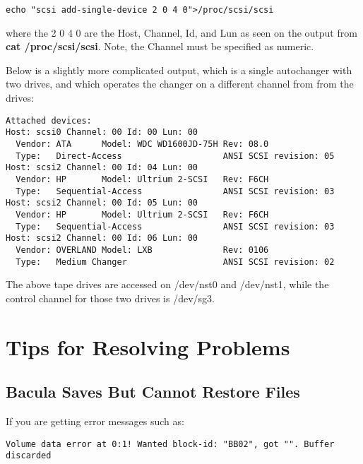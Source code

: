 \footnotesize
\begin{verbatim}
echo "scsi add-single-device 2 0 4 0">/proc/scsi/scsi
\end{verbatim}
\normalsize

where the 2 0 4 0 are the Host, Channel, Id, and Lun as seen on the output
from {\bf cat /proc/scsi/scsi}. Note, the Channel must be specified as
numeric.

Below is a slightly more complicated output, which is a single autochanger
with two drives, and which operates the changer on a different channel
from from the drives:

\footnotesize
\begin{verbatim}
Attached devices:
Host: scsi0 Channel: 00 Id: 00 Lun: 00
  Vendor: ATA      Model: WDC WD1600JD-75H Rev: 08.0
  Type:   Direct-Access                    ANSI SCSI revision: 05
Host: scsi2 Channel: 00 Id: 04 Lun: 00
  Vendor: HP       Model: Ultrium 2-SCSI   Rev: F6CH
  Type:   Sequential-Access                ANSI SCSI revision: 03
Host: scsi2 Channel: 00 Id: 05 Lun: 00
  Vendor: HP       Model: Ultrium 2-SCSI   Rev: F6CH
  Type:   Sequential-Access                ANSI SCSI revision: 03
Host: scsi2 Channel: 00 Id: 06 Lun: 00
  Vendor: OVERLAND Model: LXB              Rev: 0106
  Type:   Medium Changer                   ANSI SCSI revision: 02
\end{verbatim}
\normalsize

The above tape drives are accessed on /dev/nst0 and /dev/nst1, while
the control channel for those two drives is /dev/sg3.



\label{problems1}
\section{Tips for Resolving Problems}

\label{CannotRestore}
\subsection{Bacula Saves But Cannot Restore Files}

If you are getting error messages such as:

\footnotesize
\begin{verbatim}
Volume data error at 0:1! Wanted block-id: "BB02", got "". Buffer discarded
\end{verbatim}
\normalsize

